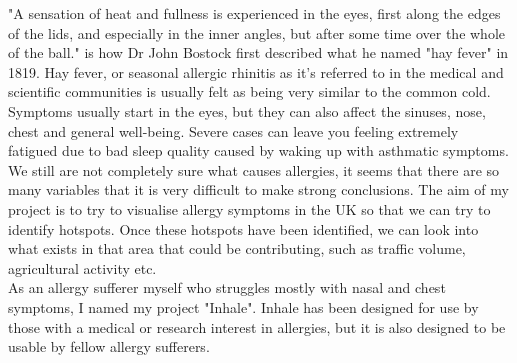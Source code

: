 "A sensation of heat and fullness is experienced in the eyes, first along the edges of the lids, and especially in the inner angles, but after some time over the whole of the ball." is how Dr John Bostock first described what he named "hay fever" in 1819. Hay fever, or seasonal allergic rhinitis as it's referred to in the medical and scientific communities is usually felt as being very similar to the common cold. Symptoms usually start in the eyes, but they can also affect the sinuses, nose, chest and general well-being. Severe cases can leave you feeling extremely fatigued due to bad sleep quality caused by waking up with asthmatic symptoms.\\

We still are not completely sure what causes allergies, it seems that there are so many variables that it is very difficult to make strong conclusions. The aim of my project is to try to visualise allergy symptoms in the UK so that we can try to identify hotspots. Once these hotspots have been identified, we can look into what exists in that area that could be contributing, such as traffic volume, agricultural activity etc.\\

As an allergy sufferer myself who struggles mostly with nasal and chest symptoms, I named my project "Inhale". Inhale has been designed for use by those with a medical or research interest in allergies, but it is also designed to be usable by fellow allergy sufferers.